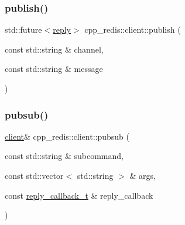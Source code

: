\mbox{\label{classcpp__redis_1_1client_ad9a8434b4ca46e185bab45cf135c9ac2}} 
\subsubsection{\texorpdfstring{publish()}{publish()}\hspace{0.1cm}{\footnotesize\ttfamily [2/2]}}
{\footnotesize\ttfamily std\+::future$<$\hyperlink{classcpp__redis_1_1reply}{reply}$>$ cpp\+\_\+redis\+::client\+::publish (\begin{DoxyParamCaption}\item[{const std\+::string \&}]{channel,  }\item[{const std\+::string \&}]{message }\end{DoxyParamCaption})}

\mbox{\label{classcpp__redis_1_1client_a4c606e08e8787971044b76930b99f30d}} 
\subsubsection{\texorpdfstring{pubsub()}{pubsub()}\hspace{0.1cm}{\footnotesize\ttfamily [1/2]}}
{\footnotesize\ttfamily \hyperlink{classcpp__redis_1_1client}{client}\& cpp\+\_\+redis\+::client\+::pubsub (\begin{DoxyParamCaption}\item[{const std\+::string \&}]{subcommand,  }\item[{const std\+::vector$<$ std\+::string $>$ \&}]{args,  }\item[{const \hyperlink{classcpp__redis_1_1client_a061a1140d36d2eaeda82b09a0bb3f9f2}{reply\+\_\+callback\+\_\+t} \&}]{reply\+\_\+callback }\end{DoxyParamCaption})}

\mbox{\label{classcpp__redis_1_1client_a9f5ae4ef589038af3f7e8304a56446e2}} 
